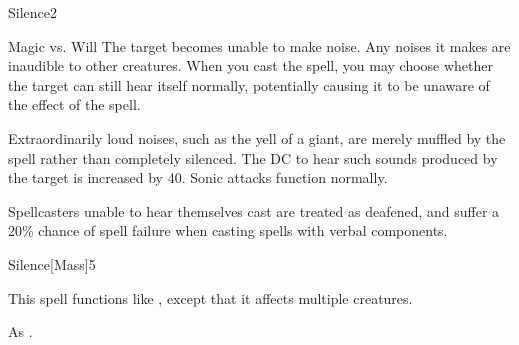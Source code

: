 \begin{spellsection}{Silence}{2}
    \begin{spellheader}
    \end{spellheader}
    \begin{spellcontent}
        \begin{spelltargetinginfo}
        \end{spelltargetinginfo}
        \begin{spelleffects}
            \begin{spellattack}{Magic vs. Will}
                \spelleffect The target becomes unable to make noise. Any noises it makes are inaudible to other creatures. When you cast the spell, you may choose whether the target can still hear itself normally, potentially causing it to be unaware of the effect of the spell.

                Extraordinarily loud noises, such as the yell of a giant, are merely muffled by the spell rather than completely silenced. The DC to hear such sounds produced by the target is increased by 40. Sonic attacks function normally.
            \end{spellattack}
            \spelldur \durshort \dismissable
        \end{spelleffects}
    \end{spellcontent}
    \begin{spellfooter}
        \spellnotes Spellcasters unable to hear themselves cast are treated as deafened, and suffer a 20\% chance of spell failure when casting spells with verbal components.
        \miscastrandom
    \end{spellfooter}
\end{spellsection}

\begin{spellsection}{Silence}[Mass]{5}
    \begin{spellheader}
    \end{spellheader}
    \begin{spellcontent}
        \begin{spelltargetinginfo}
        \end{spelltargetinginfo}
        \begin{spelleffects}
            \spellspecial This spell functions like , except that it affects multiple creatures.
        \end{spelleffects}
    \end{spellcontent}
    \begin{spellfooter}
        \spellnotes As .
        \miscastexplode
    \end{spellfooter}
\end{spellsection}

